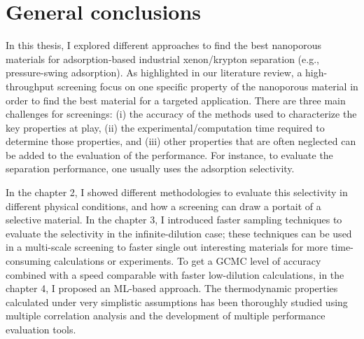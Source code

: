 
\chapter*{General conclusions}

In this thesis, I explored different approaches to find the best nanoporous materials for adsorption-based industrial xenon/krypton separation (e.g., pressure-swing adsorption). As highlighted in our literature review, a high-throughput screening focus on one specific property of the nanoporous material in order to find the best material for a targeted application. There are three main challenges for screenings: (i) the accuracy of the methods used to characterize the key properties at play, (ii) the experimental/computation time required to determine those properties, and (iii) other properties that are often neglected can be added to the evaluation of the performance. For instance, to evaluate the separation performance, one usually uses the adsorption selectivity. 

In the chapter 2, I showed different methodologies to evaluate this selectivity in different physical conditions, and how a screening can draw a portait of a selective material. In the chapter 3, I introduced faster sampling techniques to evaluate the selectivity in the infinite-dilution case; these techniques can be used in a multi-scale screening to faster single out interesting materials for more time-consuming calculations or experiments. To get a GCMC level of accuracy combined with a speed comparable with faster low-dilution calculations, in the chapter 4, I proposed an ML-based approach. The thermodynamic properties calculated under very simplistic assumptions has been thoroughly studied using multiple correlation analysis and the development of multiple performance evaluation tools.

